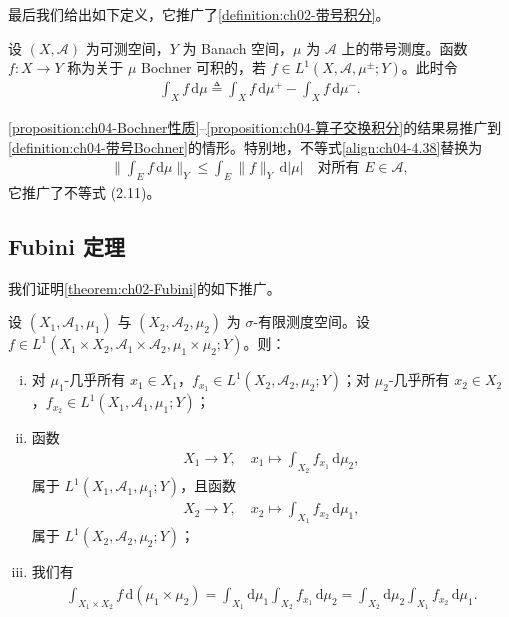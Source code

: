 \documentclass[../../main.tex]{subfiles}%
\begin{document}
最后我们给出如下定义，它推广了\cref{definition:ch02-带号积分}。

\begin{definition}\label{definition:ch04-带号Bochner}
设 $(X,\mathcal{A})$ 为可测空间，$Y$ 为 Banach 空间，$\mu$ 为 $\mathcal{A}$ 上的带号测度。函数 $f:X\to Y$ 称为关于 $\mu$ Bochner 可积的，若 $f\in L^1(X,\mathcal{A},\mu^\pm;Y)$。此时令
\begin{align*}
\int_X f\,\mathrm{d}\mu\triangleq \int_X f\,\mathrm{d}\mu^+-\int_X f\,\mathrm{d}\mu^-.
\end{align*}
\end{definition}

\cref{proposition:ch04-Bochner性质}--\cref{proposition:ch04-算子交换积分}的结果易推广到\cref{definition:ch04-带号Bochner}的情形。特别地，不等式\eqref{align:ch04-4.38}替换为
\begin{align*}
\Big\|\int_E f\,\mathrm{d}\mu\Big\|_Y\leqslant\int_E\|f\|_Y\,\mathrm{d}|\mu|\quad\text{对所有 }E\in\mathcal{A},
\end{align*}
它推广了不等式 (2.11)。

\subsection{Fubini 定理}\label{subsection:ch04-Fubini}

我们证明\cref{theorem:ch02-Fubini}的如下推广。

\begin{theorem}[Fubini]\label{theorem:ch04-Fubini}
设 $(X_1,\mathcal{A}_1,\mu_1)$ 与 $(X_2,\mathcal{A}_2,\mu_2)$ 为 $\sigma$-有限测度空间。设 $f\in L^1(X_1\times X_2,\mathcal{A}_1\times\mathcal{A}_2,\mu_1\times\mu_2;Y)$。则：
\begin{enumerate}[(i)]
\item\label{item:ch04-Fubini-i} 对 $\mu_1$-几乎所有 $x_1\in X_1$，$f_{x_1}\in L^1(X_2,\mathcal{A}_2,\mu_2;Y)$；对 $\mu_2$-几乎所有 $x_2\in X_2$，$f_{x_2}\in L^1(X_1,\mathcal{A}_1,\mu_1;Y)$；
\item\label{item:ch04-Fubini-ii} 函数
\begin{align}
X_1\to Y,\quad x_1\mapsto\int_{X_2}f_{x_1}\,\mathrm{d}\mu_2, \label{align:ch04-4.49}
\end{align}
属于 $L^1(X_1,\mathcal{A}_1,\mu_1;Y)$，且函数
\begin{align}
X_2\to Y,\quad x_2\mapsto\int_{X_1}f_{x_2}\,\mathrm{d}\mu_1, \label{align:ch04-4.50}
\end{align}
属于 $L^1(X_2,\mathcal{A}_2,\mu_2;Y)$；
\item\label{item:ch04-Fubini-iii} 我们有
\begin{align}
\int_{X_1\times X_2}f\,\mathrm{d}(\mu_1\times\mu_2)=\int_{X_1}\mathrm{d}\mu_1\int_{X_2}f_{x_1}\,\mathrm{d}\mu_2=\int_{X_2}\mathrm{d}\mu_2\int_{X_1}f_{x_2}\,\mathrm{d}\mu_1. \label{align:ch04-4.51}
\end{align}
\end{enumerate}
\end{theorem}
\end{document}
